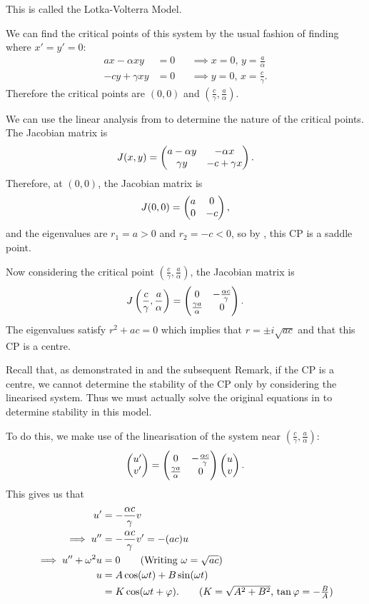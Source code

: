 This is called the Lotka-Volterra Model.

We can find the critical points of this system by the usual fashion of finding where $x'=y'=0$:
\begin{equation*}
	\begin{alignedat}{2}
		ax - \alpha xy &= 0 &&\implies x=0, \,y = \frac{a}{\alpha} \\
		-cy + \gamma xy &= 0 &&\implies y=0, \,x = \frac{c}{\gamma}.
	\end{alignedat}
\end{equation*}
Therefore the critical points are $(0,0)$ and $(\frac{c}{\gamma}, \frac{a}{\alpha})$.

We can use the linear analysis from  to determine the nature of the critical points. The Jacobian matrix is
\[
J(x,y) = \begin{pmatrix}a-\alpha y & -\alpha x \\ \gamma y & -c+\gamma x\end{pmatrix}.
\]
Therefore, at $(0,0)$, the Jacobian matrix is
\[
J(0,0) = \begin{pmatrix}a & 0 \\ 0 & -c\end{pmatrix},
\]
and the eigenvalues are $r_1=a>0$ and $r_2=-c<0$, so by , this CP is a saddle point.

Now considering the critical point $(\frac{c}{\gamma}, \frac{a}{\alpha})$, the Jacobian matrix is
\[
J\left(\frac{c}{\gamma}, \frac{a}{\alpha}\right) = \begin{pmatrix}0 & -\frac{\alpha c}{\gamma} \\ \frac{\gamma a}{\alpha} & 0\end{pmatrix}.
\]
The eigenvalues satisfy $r^2 + ac = 0$ which implies that $r = \pm i\sqrt{ac}$ and that this CP is a centre.

Recall that, as demonstrated in  and the subsequent Remark, if the CP is a centre, we cannot determine the stability of the CP only by considering the linearised system. Thus we must actually solve the original equations in  to determine stability in this model.

To do this, we make use of the linearisation of the system near $(\frac{c}{\gamma}, \frac{a}{\alpha})$:
\begin{equation}\label{eq:lvlinear}
	\begin{pmatrix}u'\\v'\end{pmatrix} = \begin{pmatrix}0 & -\frac{\alpha c}{\gamma} \\ \frac{\gamma a}{\alpha} & 0\end{pmatrix} \begin{pmatrix}u\\v\end{pmatrix}.
\end{equation}
This gives us that
\begin{align*}
	u' &= -\frac{\alpha c}{\gamma}v \\
	\implies u'' &= -\frac{\alpha c}{\gamma}v' = -(ac) u \\
	\implies u'' + \omega^2u &= 0 \tag{Writing $\omega=\sqrt{ac}$} \\
	u &= A\cos(\omega t) + B\sin(\omega t) \\
	&= K\cos(\omega t + \varphi). \tag{$K = \sqrt{A^2 + B^2}$, $\tan\varphi = -\frac{B}{A}$}
\end{align*}

